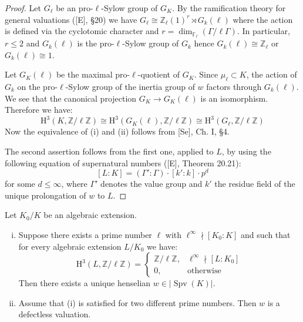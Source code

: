 \begin{proof}
Let $G_\ell$ be an pro-$\ell$-Sylow group of $G_K$. By the ramification theory for general valuations ([E], §20) we have $G_\ell\cong\mathbb{Z}_\ell(1)^r\rtimes G_k(\ell)$ where the action is defined via the cyclotomic character and $r = \dim_{\mathbb{F}_\ell}(\Gamma/\ell\Gamma)$. In particular, $r\leq 2$ and $G_k(\ell)$ is the pro-$\ell$-Sylow group of $G_k$ hence $G_k(\ell)\cong \mathbb{Z}_\ell$ or $G_k(\ell) \cong 1$.

Let $G_K(\ell)$ be the maximal pro-$\ell$-quotient of $G_K$. Since $\mu_\ell\subset K$, the action of $G_k$ on the pro-$\ell$-Sylow group of the inertia group of $w$ factors through $G_k(\ell)$. We see that the canonical projection $G_K\to G_K(\ell)$ is an isomorphism. Therefore we have:
\[ \mathrm{H}^3(K,\mathbb{Z}/\ell\mathbb{Z}) \cong\mathrm{H}^3(G_K(\ell),\mathbb{Z}/\ell\mathbb{Z}) \cong\mathrm{H}^3(G_\ell,\mathbb{Z}/\ell\mathbb{Z}) \]
Now the equivalence of (i) and (ii) follows from [Se], Ch. I, §4.

The second assertion follows from the first one, applied to $L$, by using the following equation of supernatural numbers ([E], Theorem 20.21):
\[ [L:K] = (\Gamma':\Gamma) \cdot [k':k]\cdot p^d \]
for some $d \leq \infty$, where $\Gamma'$ denotes the value group and $k'$ the residue field of the unique prolongation of $w$ to $L$.
\end{proof}

\begin{proposition}\label{2.6}
Let $K_0/K$ be an algebraic extension.
\begin{enumerate}[(i)]
\item Suppose there exists a prime number $\ell$ with $\ell^\infty\nmid[K_0:K]$ and such that for every algebraic extension $L/K_0$ we have: 
\[ \mathrm{H}^3(L,\mathbb{Z}/\ell\mathbb{Z}) = \begin{cases}
\mathbb{Z}/\ell\mathbb{Z}, & \ell^\infty\nmid [L:K_0]\\
0, & \text{otherwise}
\end{cases} \]
Then there exists a unique henselian $w\in|\operatorname{Spv}(K)|$.
\item Assume that (i) is satisfied for two different prime numbers. Then $w$ is a defectless valuation.
\end{enumerate}
\end{proposition}

